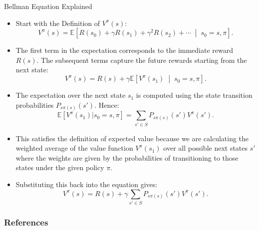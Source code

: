 \documentclass[handout]{beamer}
\begin{document}
\begin{frame}{Bellman Equation Explained}
\scriptsize
\begin{itemize}
\item Start with the Definition of \( V^\pi(s) \):
\[
V^{\pi}(s) = \mathbb{E}\left[ R(s_0) + \gamma R(s_1) + \gamma^2 R(s_2) + \cdots \;\middle|\; s_0 = s, \pi \right].
\]

    \item The first term in the expectation corresponds to the immediate reward \( R(s) \). The subsequent terms capture the future rewards starting from the next state:
\[
V^\pi(s) = R(s) + \gamma \mathbb{E}\left[V^\pi(s_1) \;\middle|\; s_0 = s, \pi\right].
\]

\item The expectation over the next state \( s_1 \) is computed using the state transition probabilities \( P_{s\pi(s)}(s') \). Hence:
\[
\mathbb{E}[V^\pi(s_1) | s_0 = s, \pi] = \sum_{s' \in S} P_{s\pi(s)}(s') V^\pi(s').
\]

\item This satisfies the definition of expected value because we are calculating the weighted average of the value function \( V^\pi(s_1) \) over all possible next states \( s' \) where the  weights are given by the probabilities of transitioning to those states under the given policy \( \pi \). 

\item Substituting this back into the equation gives:
\[
V^\pi(s) = R(s) + \gamma \sum_{s' \in S} P_{s\pi(s)}(s') V^\pi(s').
\]


\end{itemize}
\end{frame}




\begin{frame}[allowframebreaks]\scriptsize
\frametitle{References}


%
\end{frame}  









\end{document}
